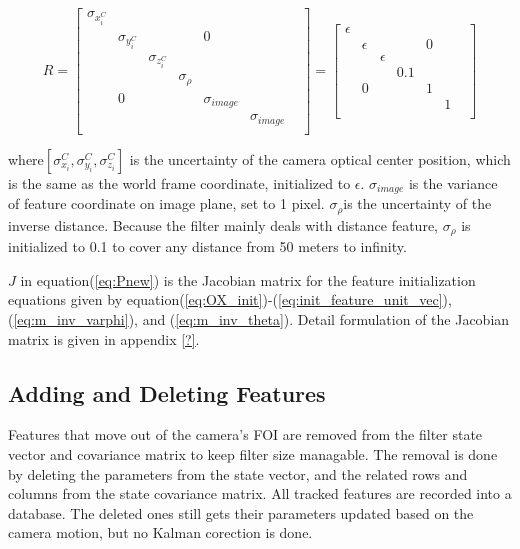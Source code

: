 \begin{equation}
\label{eq:R}
R=\begin{bmatrix}
\sigma _{x_{i}^{C}} & & & & & & \\
 & \sigma _{y_{i}^{C}} & & & 0 & & \\
 & & \sigma _{z_{i}^{C}} & & & & \\
 & & & \sigma _{\rho } & & & \\
 & 0 & & & \sigma _{image} & & \\
 & & & & & \sigma _{image} & \\
\end{bmatrix}
 = \begin{bmatrix}
\epsilon & & & & & & \\
 & \epsilon & & & 0 & & \\
 & & \epsilon & & & & \\
 & & & 0.1 & & & \\
 & 0 & & & 1 & & \\
 & & & & & 1 & \\
\end{bmatrix} 
\end{equation}

\noindent where$[\sigma_{x_{i}}^{C}, \sigma_{y_{i}}^{C}, \sigma
_{z_{i}}^{C}]$ is the uncertainty of the camera optical center
position, which is the same as the world frame coordinate, initialized
to $\epsilon$. $\sigma_{image}$ is the variance of feature coordinate
on image plane, set to 1 pixel. $\sigma _{\rho } $is the uncertainty
of the inverse distance. Because the filter mainly deals with distance
feature, $ \sigma _{\rho }$ is initialized to 0.1 to cover any
distance from 50 meters to infinity.

$J$ in equation(\ref{eq:Pnew}) is the Jacobian matrix for the feature
initialization equations given by
equation(\ref{eq:OX_init})-(\ref{eq:init_feature_unit_vec}),
(\ref{eq:m_inv_varphi}), and (\ref{eq:m_inv_theta}). Detail
formulation of the Jacobian matrix is given in appendix \ref{?}.



\subsection{Adding and Deleting Features}
Features that move out of the camera's FOI are removed from the filter
state vector and covariance matrix to keep filter size managable. 
The removal is done by deleting the parameters from the state 
vector, and the related rows and columns from the state covariance 
matrix. All tracked features are recorded into a database. The deleted
ones still gets their parameters updated based on the camera motion,
but no Kalman corection is done.

